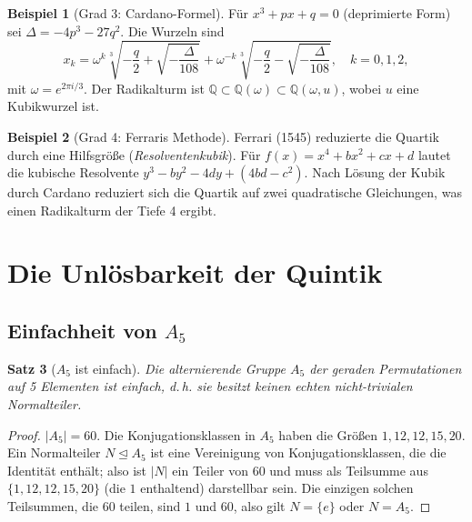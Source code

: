 \documentclass[12pt,a4paper]{amsart}
\newtheorem{theorem}{Satz}[section]
\theoremstyle{definition}
\newtheorem{beispiel}[theorem]{Beispiel}
\newcommand{\Q}{\mathbb{Q}}
\begin{document}
\begin{beispiel}[Grad 3: Cardano-Formel]
Für $x^3 + px + q = 0$ (deprimierte Form) sei $\Delta = -4p^3 - 27q^2$.
Die Wurzeln sind
\[
  x_k = \omega^k \sqrt[3]{-\frac{q}{2} + \sqrt{-\frac{\Delta}{108}}}
       + \omega^{-k} \sqrt[3]{-\frac{q}{2} - \sqrt{-\frac{\Delta}{108}}},
  \quad k = 0,1,2,
\]
mit $\omega = e^{2\pi i/3}$. Der Radikalturm ist
$\Q \subset \Q(\omega) \subset \Q(\omega, u)$, wobei $u$ eine Kubikwurzel ist.
\end{beispiel}

\begin{beispiel}[Grad 4: Ferraris Methode]
Ferrari (1545) reduzierte die Quartik durch eine Hilfsgröße (\emph{Resolventenkubik}).
Für $f(x) = x^4 + bx^2 + cx + d$ lautet die kubische Resolvente
$y^3 - by^2 - 4dy + (4bd - c^2)$. Nach Lösung der Kubik durch Cardano
reduziert sich die Quartik auf zwei quadratische Gleichungen, was einen
Radikalturm der Tiefe 4 ergibt.
\end{beispiel}

\section{Die Unlösbarkeit der Quintik}

\subsection{Einfachheit von $A_5$}

\begin{theorem}[$A_5$ ist einfach]
\label{thm:a5einfach}
Die alternierende Gruppe $A_5$ der geraden Permutationen auf 5 Elementen
ist einfach, d.\,h. sie besitzt keinen echten nicht-trivialen Normalteiler.
\end{theorem}

\begin{proof}
$|A_5| = 60$. Die Konjugationsklassen in $A_5$ haben die Größen
$1, 12, 12, 15, 20$. Ein Normalteiler $N \trianglelefteq A_5$ ist eine
Vereinigung von Konjugationsklassen, die die Identität enthält; also ist $|N|$
ein Teiler von $60$ und muss als Teilsumme aus $\{1, 12, 12, 15, 20\}$
(die $1$ enthaltend) darstellbar sein. Die einzigen solchen Teilsummen, die
$60$ teilen, sind $1$ und $60$, also gilt $N = \{e\}$ oder $N = A_5$.
\end{proof}
\end{document}
